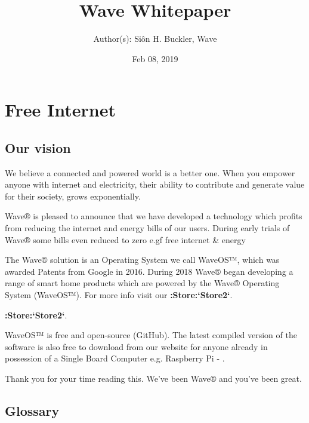 \documentclass[letterpaper,10pt,openany,oneside,english]{sphinxmanual}
\title{Wave Whitepaper}
\date{Feb 08, 2019}
\author{Author(s): Siôn H. Buckler, Wave}
\begin{document}
\maketitle
\sphinxtableofcontents
{}\label{\detokenize{index::doc}}



\chapter{Free Internet}
\label{\detokenize{index:free-internet}}


\section{Our vision}
\label{\detokenize{index:our-vision}}
We believe a connected and powered world is a better one. When you empower anyone with internet and electricity, their ability to contribute and generate value for their society, grows exponentially.

Wave® is pleased to announce that we have developed a technology which profits from reducing the internet and energy bills of our users. During early trials of Wave® some bills even reduced to zero e.gf free internet \& energy

The Wave® solution is an Operating System we call WaveOS™, which was awarded Patents from Google in 2016. During 2018 Wave® began developing a range of smart home products which are powered by the Wave® Operating System (WaveOS™). For more info visit our {\color{red}\bfseries{}:Store:{}`Store2{}`}.

{\color{red}\bfseries{}:Store:{}`Store2{}`}.

WaveOS™ is free and open-source (GitHub). The latest compiled version of the software is also free to download from our website for anyone already in possession of a Single Board Computer e.g. Raspberry Pi - .

Thank you for your time reading this.
We’ve been Wave® and you’ve been great.


\section{Glossary}
\label{\detokenize{index:glossary}}
\end{document}
